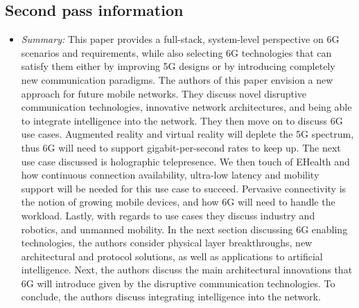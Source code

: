 \documentclass[letterpaper,twocolumn,10pt]{article}
\begin{document}
\subsection{Second pass information}
\label{sec:second}
\begin{itemize}

\item {\it Summary:} 
This paper provides a full-stack, system-level perspective on 6G scenarios and requirements, while also
selecting 6G technologies that can satisfy them either by improving 5G designs or by introducing completely
new communication paradigms. The authors of this paper envision a new approach for future mobile networks.
They discuss novel disruptive communication technologies, innovative network architectures, and being able
to integrate intelligence into the network. They then move on to discuss 6G use cases. Augmented reality and 
virtual reality will deplete the 5G spectrum, thus 6G will need to support gigabit-per-second rates to keep up.
The next use case discussed is holographic telepresence. We then touch of EHealth and how continuous 
connection availability, ultra-low latency and mobility support will be needed for this use case to succeed.
Pervasive connectivity is the notion of growing mobile devices, and how 6G will need to handle the workload.
Lastly, with regards to use cases they discuss industry and robotics, and unmanned mobility. In the next section
discussing 6G enabling technologies, the authors consider physical layer breakthroughs, new architectural and 
protocol solutions, as well as applications to artificial intelligence. Next, the authors discuss the main 
architectural innovations that 6G will introduce given by the disruptive communication technologies. To conclude,
the authors discuss integrating intelligence into the network.

\end{itemize}
\end{document}
